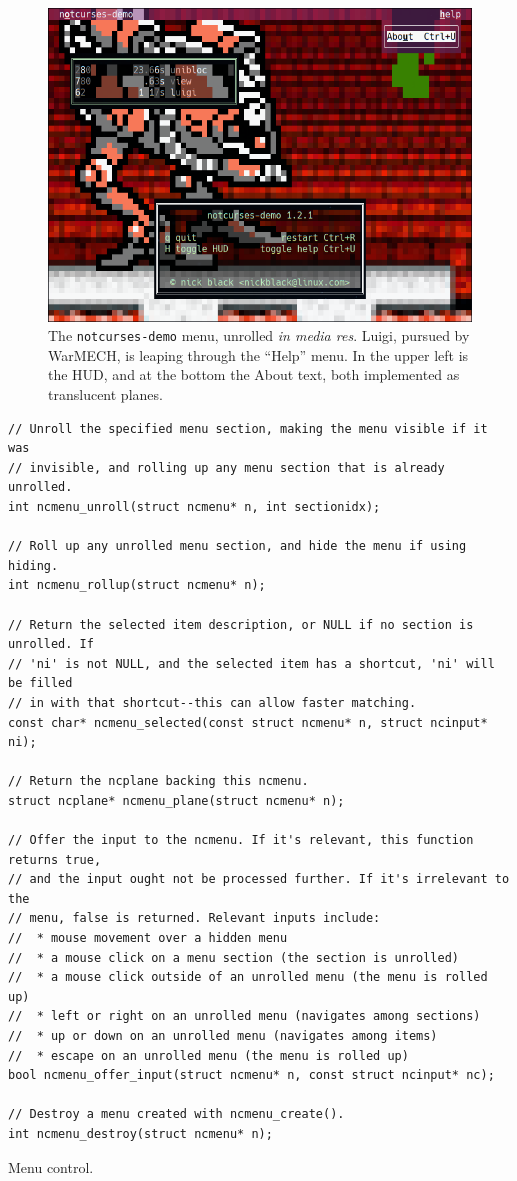 \documentclass[letterpaper,10pt]{article}
\begin{document}
\begin{figure}
    \centering
    \includegraphics[width=.75\linewidth]{media/menuwarmech.png}
    \caption[WarMECH and a translucent menu.]{The \texttt{notcurses-demo} menu, unrolled \textit{in media res}. Luigi, pursued
      by WarMECH, is leaping through the ``Help'' menu. In the upper left is the HUD,
      and at the bottom the About text, both implemented as translucent planes.}
\end{figure}

\begin{listing}[!htbp]
\begin{verbatim}
// Unroll the specified menu section, making the menu visible if it was
// invisible, and rolling up any menu section that is already unrolled.
int ncmenu_unroll(struct ncmenu* n, int sectionidx);

// Roll up any unrolled menu section, and hide the menu if using hiding.
int ncmenu_rollup(struct ncmenu* n);

// Return the selected item description, or NULL if no section is unrolled. If
// 'ni' is not NULL, and the selected item has a shortcut, 'ni' will be filled
// in with that shortcut--this can allow faster matching.
const char* ncmenu_selected(const struct ncmenu* n, struct ncinput* ni);

// Return the ncplane backing this ncmenu.
struct ncplane* ncmenu_plane(struct ncmenu* n);

// Offer the input to the ncmenu. If it's relevant, this function returns true,
// and the input ought not be processed further. If it's irrelevant to the
// menu, false is returned. Relevant inputs include:
//  * mouse movement over a hidden menu
//  * a mouse click on a menu section (the section is unrolled)
//  * a mouse click outside of an unrolled menu (the menu is rolled up)
//  * left or right on an unrolled menu (navigates among sections)
//  * up or down on an unrolled menu (navigates among items)
//  * escape on an unrolled menu (the menu is rolled up)
bool ncmenu_offer_input(struct ncmenu* n, const struct ncinput* nc);

// Destroy a menu created with ncmenu_create().
int ncmenu_destroy(struct ncmenu* n);
\end{verbatim}
\caption{Menu control.}
\end{listing}
\end{document}
